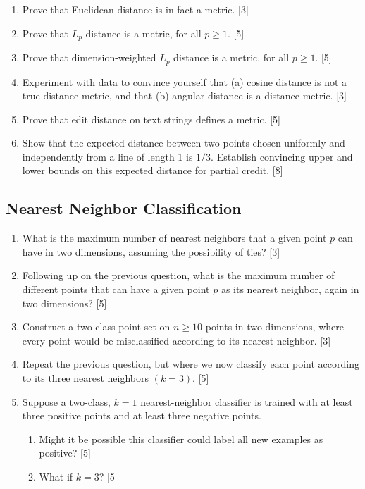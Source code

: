 \documentclass[10pt]{article}
\begin{document}
\begin{enumerate}
    \item Prove that Euclidean distance is in fact a metric. \hfill [3]
    \item Prove that $L_{p}$ distance is a metric, for all $p \geq 1$. \hfill [5]
    \item Prove that dimension-weighted $L_{p}$ distance is a metric, for all $p \geq 1$. \hfill [5]
    \item Experiment with data to convince yourself that (a) cosine distance is not a true distance metric, and that (b) angular distance is a distance metric. \hfill [3]
    \item Prove that edit distance on text strings defines a metric. \hfill [5]
    \item Show that the expected distance between two points chosen uniformly and independently from a line of length 1 is $1/3$. Establish convincing upper and lower bounds on this expected distance for partial credit. \hfill [8]
\end{enumerate}

\subsection{Nearest Neighbor Classification}

\begin{enumerate}
    \item What is the maximum number of nearest neighbors that a given point $p$ can have in two dimensions, assuming the possibility of ties? \hfill [3]
    \item Following up on the previous question, what is the maximum number of different points that can have a given point $p$ as its nearest neighbor, again in two dimensions? \hfill [5]
    \item Construct a two-class point set on $n \geq 10$ points in two dimensions, where every point would be misclassified according to its nearest neighbor. \hfill [3]
    \item Repeat the previous question, but where we now classify each point according to its three nearest neighbors $(k=3)$. \hfill [5]
    \item Suppose a two-class, $k=1$ nearest-neighbor classifier is trained with at least three positive points and at least three negative points.
    \begin{enumerate}
        \item Might it be possible this classifier could label all new examples as positive? \hfill [5]
        \item What if $k=3$? \hfill [5]
    \end{enumerate}
\end{enumerate}
\end{document}
